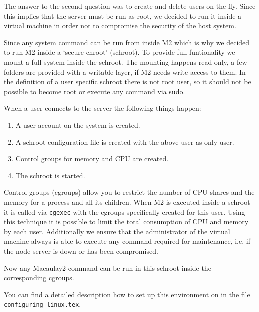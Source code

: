 \documentclass[]{article}
\begin{document}
The answer to the second question was to create and delete users on
the fly. Since this implies that the server must be run as root, we
decided to run it inside a virtual machine in order not to compromise
the security of the host system.


Since any system command can be run from inside M2 which is why we
decided to run M2 inside a `secure chroot' (schroot). To provide full
funtionality we mount a full system inside the schroot. The mounting
happens read only, a few folders are provided with a writable layer,
if M2 needs write access to them. In the definition of a user specific
schroot there is not root user, so it should not be possible to become
root or execute any command via sudo.

When a user connects to the server the following things happen:
\begin{enumerate}
\item A user account on the system is created.
\item A schroot configuration file is created with the above user as only user.
\item Control groups for memory and CPU are created.
\item The schroot is started.
\end{enumerate}

Control groups (cgroups) allow you to restrict the number of CPU
shares and the memory for a process and all its children. When M2 is
executed inside a schroot it is called via {\tt cgexec} with the
cgroups specifically created for this user. Using this technique it is
possible to limit the total consumption of CPU and memory by each
user. Additionally we ensure that the administrator of the virtual
machine always is able to execute any command required for
maintenance, i.e. if the node server is down or has been compromised.

Now any Macaulay2 command can be run in this schroot inside the
corresponding cgroups.

You can find a detailed description how to set up this environment on
\cite{trym2-github} in the file {\tt configuring\_linux.tex}.



\end{document}
